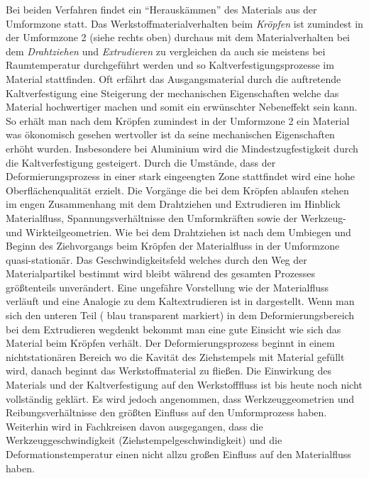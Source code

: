 \documentclass[12pt,a4paper,parskip,twoside,BCOR5mm,headsepline]{scrartcl}
\begin{document}
\begin{description*}
Bei beiden Verfahren findet ein "`Herauskämmen"' des Materials aus der Umformzone statt. Das Werkstoffmaterialverhalten beim \emph{Kröpfen} ist zumindest in der Umformzone 2 (siehe  rechts oben) durchaus mit dem Materialverhalten bei dem \emph{Drahtziehen} und \emph{Extrudieren} zu vergleichen da auch sie meistens bei Raumtemperatur durchgeführt werden und so Kaltverfestigungsprozesse im Material stattfinden. Oft erfährt das Ausgangsmaterial durch die auftretende Kaltverfestigung        
eine Steigerung der mechanischen Eigenschaften welche das Material hochwertiger machen und somit ein erwünschter Nebeneffekt sein kann. So erhält man nach dem Kröpfen zumindest in der Umformzone 2 ein Material was ökonomisch gesehen wertvoller ist da seine mechanischen Eigenschaften erhöht wurden. Insbesondere bei Aluminium wird die Mindestzugfestigkeit durch die Kaltverfestigung gesteigert. Durch die Umstände, dass der Deformierungsprozess in einer stark eingeengten Zone stattfindet wird eine hohe Oberflächenqualität erzielt. Die Vorgänge die bei dem Kröpfen ablaufen stehen im engen Zusammenhang mit dem Drahtziehen und Extrudieren im Hinblick  Materialfluss, Spannungsverhältnisse den Umformkräften sowie der Werkzeug- und Wirkteilgeometrien. Wie bei dem Drahtziehen ist nach dem Umbiegen und Beginn des Ziehvorgangs beim Kröpfen der Materialfluss in der Umformzone quasi-stationär. Das Geschwindigkeitsfeld welches durch den Weg der Materialpartikel bestimmt wird bleibt während des gesamten Prozesses größtenteils unverändert. Eine ungefähre Vorstellung wie der Materialfluss verläuft und  eine Analogie zu dem Kaltextrudieren ist in  dargestellt. Wenn man sich den unteren Teil ( blau transparent markiert) in dem Deformierungsbereich bei dem Extrudieren wegdenkt bekommt man  eine gute Einsicht wie sich das Material beim Kröpfen verhält. Der Deformierungsprozess beginnt in einem nichtstationären Bereich wo die Kavität des Ziehstempels mit Material gefüllt wird, danach beginnt das  Werkstoffmaterial zu fließen. Die Einwirkung des Materials und der Kaltverfestigung auf den Werkstofffluss ist bis heute noch nicht vollständig geklärt. Es wird jedoch angenommen, dass  
Werkzeuggeometrien und Reibungsverhältnisse den größten Einfluss auf den Umformprozess haben. Weiterhin wird in Fachkreisen davon ausgegangen, dass die Werkzeuggeschwindigkeit (Ziehstempelgeschwindigkeit) und die Deformationstemperatur einen nicht allzu großen Einfluss auf den Materialfluss haben. \autocite[13.10]{kl} 



\end{description*}
\end{document}
